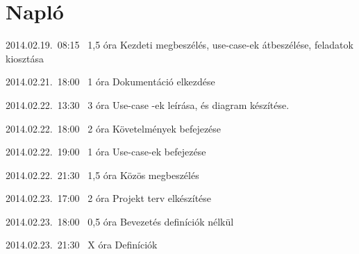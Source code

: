 %
\section{Napló}

\begin{naplo}

\bejegyzes
{2014.02.19.~08:15~}
{1,5 óra}
{\adam\newline
\antal\newline
\bator\newline
\torok}
{Kezdeti megbeszélés, use-case-ek átbeszélése, feladatok kiosztása}

\bejegyzes
{2014.02.21.~18:00~} %
{1 óra} %
{\antal} %
{Dokumentáció elkezdése} %

\bejegyzes
{2014.02.22.~13:30~}
{3 óra}
{\adam}
{Use-case -ek leírása, és diagram készítése.}

\bejegyzes
{2014.02.22.~18:00~}
{2 óra}
{\bator}
{Követelmények befejezése}

\bejegyzes
{2014.02.22.~19:00~}
{1 óra}
{\adam}
{Use-case-ek befejezése}

\bejegyzes
{2014.02.22.~21:30~}
{1,5 óra}
{\adam\newline
\antal\newline
\bator\newline
\torok}
{Közös megbeszélés}

\bejegyzes
{2014.02.23.~17:00~}
{2 óra}
{\bator}
{Projekt terv elkészítése}

\bejegyzes
{2014.02.23.~18:00~}
{0,5 óra}
{\antal}
{Bevezetés definíciók nélkül}

\bejegyzes
{2014.02.23.~21:30~}
{X óra}
{\antal}
{Definíciók}

\end{naplo}
